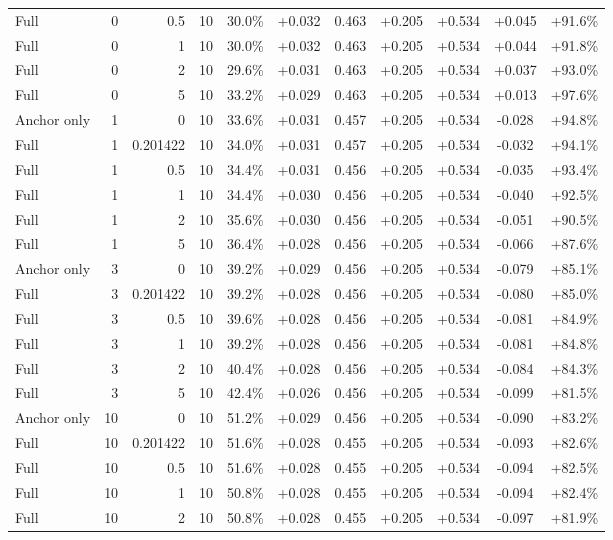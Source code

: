 \begin{table}[htbp]
\begin{tabular}{lrrrccccccc}
Full & 0 & 0.5 & 10 & 30.0\% & +0.032 & 0.463 & +0.205 & +0.534 & +0.045 & +91.6\% \\
Full & 0 & 1 & 10 & 30.0\% & +0.032 & 0.463 & +0.205 & +0.534 & +0.044 & +91.8\% \\
Full & 0 & 2 & 10 & 29.6\% & +0.031 & 0.463 & +0.205 & +0.534 & +0.037 & +93.0\% \\
Full & 0 & 5 & 10 & 33.2\% & +0.029 & 0.463 & +0.205 & +0.534 & +0.013 & +97.6\% \\
Anchor only & 1 & 0 & 10 & 33.6\% & +0.031 & 0.457 & +0.205 & +0.534 & -0.028 & +94.8\% \\
Full & 1 & 0.201422 & 10 & 34.0\% & +0.031 & 0.457 & +0.205 & +0.534 & -0.032 & +94.1\% \\
Full & 1 & 0.5 & 10 & 34.4\% & +0.031 & 0.456 & +0.205 & +0.534 & -0.035 & +93.4\% \\
Full & 1 & 1 & 10 & 34.4\% & +0.030 & 0.456 & +0.205 & +0.534 & -0.040 & +92.5\% \\
Full & 1 & 2 & 10 & 35.6\% & +0.030 & 0.456 & +0.205 & +0.534 & -0.051 & +90.5\% \\
Full & 1 & 5 & 10 & 36.4\% & +0.028 & 0.456 & +0.205 & +0.534 & -0.066 & +87.6\% \\
Anchor only & 3 & 0 & 10 & 39.2\% & +0.029 & 0.456 & +0.205 & +0.534 & -0.079 & +85.1\% \\
Full & 3 & 0.201422 & 10 & 39.2\% & +0.028 & 0.456 & +0.205 & +0.534 & -0.080 & +85.0\% \\
Full & 3 & 0.5 & 10 & 39.6\% & +0.028 & 0.456 & +0.205 & +0.534 & -0.081 & +84.9\% \\
Full & 3 & 1 & 10 & 39.2\% & +0.028 & 0.456 & +0.205 & +0.534 & -0.081 & +84.8\% \\
Full & 3 & 2 & 10 & 40.4\% & +0.028 & 0.456 & +0.205 & +0.534 & -0.084 & +84.3\% \\
Full & 3 & 5 & 10 & 42.4\% & +0.026 & 0.456 & +0.205 & +0.534 & -0.099 & +81.5\% \\
Anchor only & 10 & 0 & 10 & 51.2\% & +0.029 & 0.456 & +0.205 & +0.534 & -0.090 & +83.2\% \\
Full & 10 & 0.201422 & 10 & 51.6\% & +0.028 & 0.455 & +0.205 & +0.534 & -0.093 & +82.6\% \\
Full & 10 & 0.5 & 10 & 51.6\% & +0.028 & 0.455 & +0.205 & +0.534 & -0.094 & +82.5\% \\
Full & 10 & 1 & 10 & 50.8\% & +0.028 & 0.455 & +0.205 & +0.534 & -0.094 & +82.4\% \\
Full & 10 & 2 & 10 & 50.8\% & +0.028 & 0.455 & +0.205 & +0.534 & -0.097 & +81.9\% \\

\end{tabular}
\end{table}
